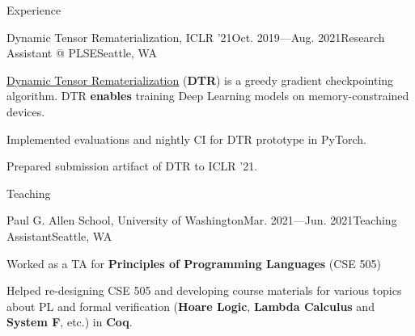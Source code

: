 \documentclass{resume}
\newcommand{\myul}[2][blue]{\setulcolor{#1}\ul{#2}\setulcolor{blue}}
\begin{document}
\begin{rSection}{Experience}
        \vspace{-5pt}
        \begin{rSubsection}{Dynamic Tensor Rematerialization, ICLR '21}{Oct. 2019---Aug. 2021}{Research Assistant @ PLSE}{Seattle, WA}
            \item \href{https://github.com/uwsampl/dtr-prototype}{\color{blue} \myul{Dynamic Tensor Rematerialization}} (\textbf{DTR}) is a greedy gradient checkpointing algorithm. DTR \textbf{enables} training Deep Learning models on memory-constrained devices.
            \item Implemented evaluations and nightly CI for DTR prototype in PyTorch.
            \item Prepared submission artifact of DTR to ICLR '21.
        \end{rSubsection}
    \end{rSection}
	\vspace{-5pt}
    \begin{rSection}{Teaching}
        \begin{rSubsection}{Paul G. Allen School, University of Washington}{Mar. 2021---Jun. 2021}{Teaching Assistant}{Seattle, WA}
			\item Worked as a TA for \textbf{Principles of Programming Languages} (CSE 505)
			\item Helped re-designing CSE 505 and developing course materials for various topics about PL and formal verification (\textbf{Hoare Logic}, \textbf{Lambda Calculus} and \textbf{System F}, etc.) in \textbf{Coq}.
		\end{rSubsection}
    \end{rSection}
    \vspace{-5pt}
\end{document}
